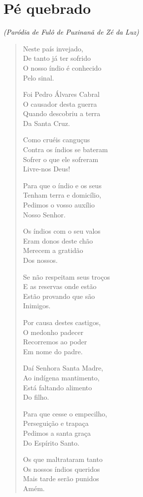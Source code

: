 \chapter{Pé quebrado}

\begin{flushright}
\emph{(Paródia de Fulô de Puxinanã de Zé da Luz)}
\end{flushright}

\begin{verse}
Neste país invejado,\\
De tanto já ter sofrido\\
O nosso índio é conhecido\\
Pelo sinal.

Foi Pedro Álvares Cabral\\
O causador desta guerra\\
Quando descobriu a terra\\
Da Santa Cruz.

Como cruéis canguçus\\
Contra os índios se bateram\\
Sofrer o que ele sofreram\\
Livre-nos Deus!

Para que o índio e os seus\\
Tenham terra e domicílio,\\
Pedimos o vosso auxílio\\
Nosso Senhor.

Os índios com o seu valos\\
Eram donos deste chão\\
Merecem a gratidão\\
Dos nossos.

Se não respeitam seus troços\\
E as reservas onde estão\\
Estão provando que são\\
Inimigos.

Por causa destes castigos,\\
O medonho padecer\\
Recorremos ao poder\\
Em nome do padre.

Daí Senhora Santa Madre,\\
Ao indígena mantimento,\\
Está faltando alimento\\
Do filho.

Para que cesse o empecilho,\\
Perseguição e trapaça\\
Pedimos a santa graça\\
Do Espírito Santo.

Os que maltrataram tanto\\
Os nossos índios queridos\\
Mais tarde serão punidos\\
Amém.
\end{verse}

